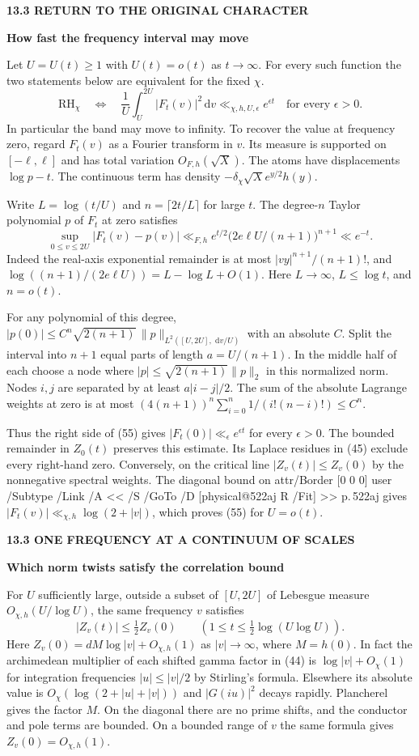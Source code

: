 \documentclass[11pt,letterpaper]{article}
\makeatletter
\newcommand{\rightmarktext}{}
\newcommand{\printfolio}{}
\newcommand{\leaf}[4]{\clearpage\gdef\printfolio{#1}\gdef\rightmarktext{#2}%
  {\small\sffamily\bfseries\color{ink}#3\par}\vspace{3pt}%
  {\LARGE\bfseries #4\par}\vspace{5pt}}
\newcommand{\dd}{\,\mathrm d}
\newcommand{\MusicPDFPageRef}[1]{\pdfpageref\csname physical@#1\endcsname\space\space 0 R}
\newcommand{\pagelink}[2]{\leavevmode\pdfstartlink attr{/Border [0 0 0]} user{%
  /Subtype /Link /A << /S /GoTo /D [\MusicPDFPageRef{#1} /Fit] >>}%
  {\color{ink}#2}\pdfendlink}
\newcommand{\pg}[1]{\pagelink{#1}{p.\,#1}}
\makeatother
\begin{document}
\leaf{522ai}{Frequency averages}{13.3 \quad RETURN TO THE ORIGINAL CHARACTER}{How fast the frequency interval may move}
Let $U=U(t)\ge1$ with $U(t)=o(t)$ as $t\to\infty$. For every such
function the two statements below are equivalent for the fixed $\chi$.
\[
 \mathrm{RH}_\chi\quad\Longleftrightarrow\quad
 \frac1U\int_U^{2U}|F_t(v)|^2\dd v
             \ll_{\chi,h,U,\epsilon} e^{\epsilon t}
        \quad\text{for every }\epsilon>0 .
 \tag{55}
\]
In particular the band may move to infinity. To recover the value at
frequency zero, regard $F_t(v)$ as a Fourier transform in $v$. Its
measure is supported on $[-\ell,\ell]$ and has total variation
$O_{F,h}(\sqrt X)$. The atoms have displacements $\log p-t$.
The continuous term has density $-\delta_\chi\sqrt X e^{y/2}h(y)$.

Write $L=\log(t/U)$ and $n=\lceil2t/L\rceil$ for large $t$. The
degree-$n$ Taylor polynomial $p$ of $F_t$ at zero satisfies
\[
 \sup_{0\le v\le2U}|F_t(v)-p(v)|
 \ll_{F,h}e^{t/2}\big(2e\ell U/(n+1)\big)^{n+1}\ll e^{-t}.
\]
Indeed the real-axis exponential remainder is at most
$|vy|^{n+1}/(n+1)!$, and $\log((n+1)/(2e\ell U))=L-\log L+O(1)$.
Here $L\to\infty$, $L\le\log t$, and $n=o(t)$.

For any polynomial of this degree,
$|p(0)|\le C^n\sqrt{2(n+1)}\,\|p\|_{L^2([U,2U],\,\dd v/U)}$
with an absolute $C$. Split the interval into $n+1$ equal parts of
length $a=U/(n+1)$. In the middle half of each choose a node where
$|p|\le\sqrt{2(n+1)}\|p\|_2$ in this normalized norm. Nodes $i,j$
are separated by at least $a|i-j|/2$. The sum of the absolute
Lagrange weights at zero is at most
$(4(n+1))^n\sum_{i=0}^n1/(i!(n-i)!)\le C^n$.

Thus the right side of (55) gives $|F_t(0)|\ll_\epsilon e^{\epsilon t}$
for every $\epsilon>0$. The bounded remainder in $Z_0(t)$ preserves
this estimate. Its Laplace residues in (45) exclude every right-hand
zero. Conversely, on the critical line $|Z_v(t)|\le Z_v(0)$ by the
nonnegative spectral weights. The diagonal bound on \pg{522aj} gives
$|F_t(v)|\ll_{\chi,h}\log(2+|v|)$, which proves (55) for $U=o(t)$.

\leaf{522aj}{Simultaneous estimates}{13.3 \quad ONE FREQUENCY AT A CONTINUUM OF SCALES}{Which norm twists satisfy the correlation bound}
For $U$ sufficiently large, outside a subset of $[U,2U]$ of
Lebesgue measure $O_{\chi,h}(U/\log U)$, the same frequency $v$ satisfies
\[
 |Z_v(t)|\le\tfrac12 Z_v(0)
 \qquad\left(1\le t\le \tfrac12\log(U\log U)\right).
 \tag{56}
\]
Here $Z_v(0)=dM\log |v|+O_{\chi,h}(1)$ as $|v|\to\infty$,
where $M=h(0)$. In fact the archimedean multiplier of each shifted
gamma factor in (44) is $\log|v|+O_\chi(1)$ for integration
frequencies $|u|\le |v|/2$ by Stirling's formula. Elsewhere its
absolute value is $O_\chi(\log(2+|u|+|v|))$ and $|G(iu)|^2$ decays
rapidly. Plancherel gives the factor $M$. On the diagonal there are no
prime shifts, and the conductor and pole terms are bounded. On a
bounded range of $v$ the same formula gives $Z_v(0)=O_{\chi,h}(1)$.
\end{document}
